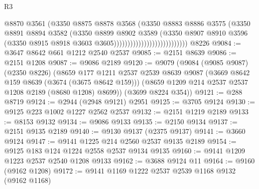\begin{lexlean}{R3}
\begin{coremodule}
                                              @8870
                                              @3561
                                              (@3350
                                                @8875
                                                @8878
                                                @3568
                                                (@3350
                                                  @8883
                                                  @8886
                                                  @3575
                                                  (@3350
                                                    @8891
                                                    @8894
                                                    @3582
                                                    (@3350
                                                      @8899
                                                      @8902
                                                      @3589
                                                      (@3350
                                                        @8907
                                                        @8910
                                                        @3596
                                                        (@3350
                                                          @8915
                                                          @8918
                                                          @3603
                                                          @3605)))))))))))))))))))))))))))
    @8226
@9084 := @3647 @8642 @661 @1212 @2540 @2537
@9085 := @2151 @8639
@9086 := @2151 @1208
@9087 := @9086 @2189
@9120 := @9079
    (@9084
      (@9085 @9087)
      (@2350 @8226)
      (@8659
        @177
        @1211
        @2537
        @2539
        @8639
        @9087
        (@3669 @8642 @159 @8639 (@3674 (@3675 @8642 @159)))
        (@8659 @1209 @214 @2537 @2537 @1208 @2189 (@8680 @1208) @8699))
      (@3699 @8224 @354))
@9121 := @288 @8719
@9124 := @2944 (@2948 @9121) @2951
@9125 := @3705 @9124
@9130 := @9125 @223 @1002 @1227 @2562 @2537
@9132 := @2151 @1219 @2189
@9133 := @8153 @9132
@9134 := @9086 @9133
@9135 := @2150 @9134
@9137 := @2151 @9135 @2189
@9140 := @9130 @9137 (@2375 @9137)
@9141 := @3660 @9124
@9147 := @9141 @1225 @214 @2560 @2537 @9135 @2189
@9154 := @9125 @183 @124 @1224 @2558 @2537 @9134 @9135
@9160 := @9141 @1209 @1223 @2537 @2540 @1208 @9133
@9162 := @3688 @9124 @11
@9164 := @9160 (@9162 @1208)
@9172 := @9141 @1169 @1222 @2537 @2539 @1168 @9132 (@9162 @1168)

\end{coremodule}
\end{lexlean}
